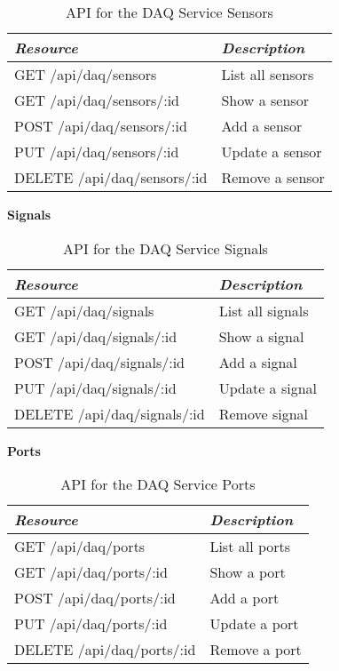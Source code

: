       \begin{table}[H]
        \centering
        \begin{tabular}{p{8cm} p{10cm}}
          \toprule
          \emph{Resource} & \emph{Description} \\ [0.5ex]
          \midrule
          GET /api/daq/sensors & List all sensors \\
          GET /api/daq/sensors/:id & Show a sensor \\
          POST /api/daq/sensors/:id & Add a sensor \\
          PUT /api/daq/sensors/:id & Update a sensor \\
          DELETE /api/daq/sensors/:id & Remove a sensor \\
          \bottomrule
        \end{tabular}
        \caption{API for the DAQ Service Sensors}\label{tab:rest-daq-sensor}
      \end{table}

      \large{\textbf{Signals}}

      \begin{table}[H]
        \centering
        \begin{tabular}{p{8cm} p{10cm}}
          \toprule
          \emph{Resource} & \emph{Description} \\ [0.5ex]
          \midrule
          GET /api/daq/signals & List all signals \\
          GET /api/daq/signals/:id & Show a signal \\
          POST /api/daq/signals/:id & Add a signal \\
          PUT /api/daq/signals/:id & Update a signal \\
          DELETE /api/daq/signals/:id & Remove signal \\
          \bottomrule
        \end{tabular}
        \caption{API for the DAQ Service Signals}\label{tab:rest-daq-signal}
      \end{table}

      \large{\textbf{Ports}}

      \begin{table}[H]
        \centering
        \begin{tabular}{p{8cm} p{10cm}}
          \toprule
          \emph{Resource} & \emph{Description} \\ [0.5ex]
          \midrule
          GET /api/daq/ports & List all ports \\
          GET /api/daq/ports/:id & Show a port \\
          POST /api/daq/ports/:id & Add a port \\
          PUT /api/daq/ports/:id & Update a port \\
          DELETE /api/daq/ports/:id & Remove a port \\
          \bottomrule
        \end{tabular}
        \caption{API for the DAQ Service Ports}\label{tab:rest-daq-port}
      \end{table}

